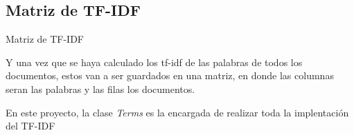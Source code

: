 \subsection{Matriz de TF-IDF}
\begin{frame}{Matriz de TF-IDF}
	\begin{center}
		Y una vez que se haya calculado los tf-idf de las palabras de todos los documentos, estos van a ser guardados
		en una matriz, en donde las columnas seran las palabras y las filas los documentos.
		
		\vspace*{1.5cm}
		
		En este proyecto, la clase \textit{Terms} es la encargada de realizar toda la implentación del TF-IDF
	\end{center}
\end{frame}